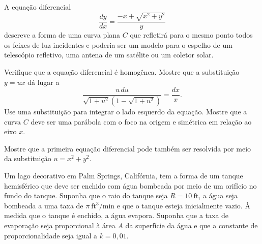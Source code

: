 \documentclass[oneside,12pt,a4paper]{report}
\begin{document}
     A equação diferencial
    $$ \frac{dy}{dx} = \frac{-x + \sqrt{x^2+y^2}}{y} $$
    descreve a forma de uma curva plana $C$ que refletirá para o mesmo ponto todos os feixes de luz incidentes e poderia ser um modelo para o espelho de um telescópio refletivo, uma antena de um satélite ou um coletor solar.
        \begin{itensquestao}
            \item Verifique que a equação diferencial é homogênea. Mostre que a substituição $y = ux$ dá lugar a
            $$ \frac{u \, du}{\sqrt{1+u^2}(1 - \sqrt{1+u^2})} = \frac{dx}{x}. $$
            Use uma substituição para integrar o lado esquerdo da equação. Mostre que a curva $C$ deve ser uma parábola com o foco na origem e simétrica em relação ao eixo $x$.
            \item Mostre que a primeira equação diferencial pode também ser resolvida por meio da substituição $u = x^2 + y^2$.
        \end{itensquestao}

    \begin{resolucao}
        
    \end{resolucao}

     Um lago decorativo em Palm Springs, Califórnia, tem a forma de um tanque hemisférico que deve ser enchido com água bombeada por meio de um orifício no fundo do tanque. Suponha que o raio do tanque seja $R = 10~\mathrm{ft}$, a água seja bombeada a uma taxa de $\pi~\mathrm{ft^3/min}$ e que o tanque esteja inicialmente vazio. À medida que o tanque é enchido, a água evapora. Suponha que a taxa de evaporação seja proporcional à área $A$ da superfície da água e que a constante de proporcionalidade seja igual a $k = 0,01$.
\end{document}
